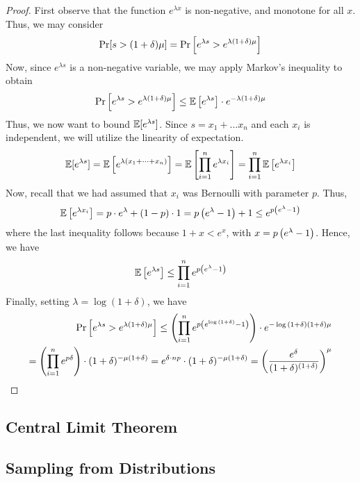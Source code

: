 \begin{proof}
    First observe that the function $e^{\lambda x}$ is non-negative, and monotone for all $x$.
    Thus, we may consider
    \begin{align*}
        \Pr[s > (1 + \delta) \mu] = \Pr\left[ e^{\lambda s} > e^{\lambda (1 + \delta)\mu} \right]
    \end{align*}
    Now, since $e^{\lambda s}$ is a non-negative variable, we may apply Markov's inequality to obtain
    \begin{align*}
        \Pr \left[ e^{\lambda s} > e^{\lambda (1 + \delta)\mu} \right] \leq \mathbb{E} \left[ e^{\lambda s}\right] \cdot e^{-\lambda (1 + \delta)\mu}
    \end{align*}
    Thus, we now want to bound $\mathbb{E}[e^{\lambda s}]$. Since $s = x_1 + \dots x_n$ and each $x_i$ is independent,
    we will utilize the linearity of expectation.
    \begin{align*}
        \mathbb{E}[e^{\lambda s}] = \mathbb{E} \left[ e^{\lambda \left( x_1 + \dots + x_n\right)} \right] = \mathbb{E} \left[ \prod_{i = 1}^n e^{\lambda x_i} \right] = \prod_{i = 1}^n \mathbb{E} \left[ e^{\lambda x_i} \right]
    \end{align*}
    Now, recall that we had assumed that $x_i$ was Bernoulli with parameter $p$. Thus,
    \begin{align*}
        \mathbb{E}\left[ e^{\lambda x_i} \right] = p \cdot e^{\lambda} + (1 - p) \cdot 1 = p \left( e^{\lambda} - 1 \right) + 1 \leq e^{p \left( e^{\lambda} - 1 \right)}
    \end{align*}
    where the last inequality follows because $1 + x < e^x$, with $x = p \left( e^\lambda - 1 \right)$.
    Hence, we have
    \begin{align*}
        \mathbb{E} \left[ e^{\lambda s} \right] \leq \prod_{i = 1}^n e^{p \left( e^{\lambda} -1 \right)}
    \end{align*}
    Finally, setting $\lambda = \log{(1 + \delta)}$, we have
    \begin{align*}
        \Pr \left[ e^{\lambda s} > e^{\lambda (1 + \delta)\mu} \right] \leq  \left( \prod_{i = 1}^n e^{p \left( e^{\log{(1 + \delta)}} -1 \right)} \right) \cdot e^{-\log{(1 + \delta)} (1 + \delta)\mu} \\
        = \left( \prod_{i = 1}^n e^{p\delta} \right) \cdot (1 + \delta)^{-\mu(1 + \delta)} = e^{\delta \cdot np} \cdot (1 + \delta)^{-\mu(1 + \delta)} = \left( \frac{e^\delta}{(1 + \delta)^{(1 + \delta)}} \right)^\mu
    \end{align*}
\end{proof}
\subsection{Central Limit Theorem}
\subsection{Sampling from Distributions}
\label{sec:prob:sampling}
